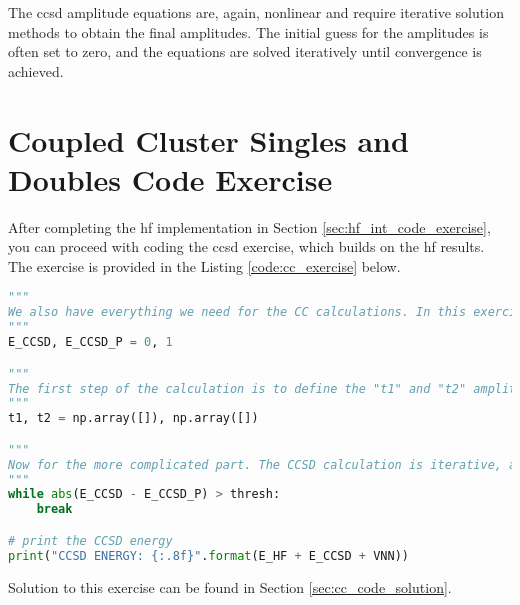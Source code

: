 The \acrshort{ccsd} amplitude equations are, again, nonlinear and require iterative solution methods to obtain the final amplitudes. The initial guess for the amplitudes is often set to zero, and the equations are solved iteratively until convergence is achieved.

\section{Coupled Cluster Singles and Doubles Code Exercise}

After completing the \acrshort{hf} implementation in Section \ref{sec:hf_int_code_exercise}, you can proceed with coding the \acrshort{ccsd} exercise, which builds on the \acrshort{hf} results. The exercise is provided in the Listing \ref{code:cc_exercise} below.

\raggedbottom\begin{lstlisting}[language=Python, caption={\acrshort{ccsd} exercise code. The energy and amplitudes are initialized with default values. The student is expected to fill the loop for the calculation of the excitation amplitudes and ground state energy. After the self-consistency is achieved the result is automatically printed.}, label=code:cc_exercise]
"""
We also have everything we need for the CC calculations. In this exercise, we will calculate the CCSD energy. Since the calculation will be iterative, I define here the CCSD energy as zero, the "E_CCSD_P" variable will be used to monitor convergence.
"""
E_CCSD, E_CCSD_P = 0, 1

"""
The first step of the calculation is to define the "t1" and "t2" amplitudes. These arrays can be initialized as zero arrays with the appropriate dimensions. I will leave this task to you.
"""
t1, t2 = np.array([]), np.array([])

"""
Now for the more complicated part. The CCSD calculation is iterative, and the convergence criterion is set by the "thresh" variable. The while loop should be filled with the appropriate calculations. The calculation of the "t1" and "t2" amplitudes is the most challenging part of the CCSD calculation. After convergence, the "E_CCSD" variable should store the final CCSD energy.
"""
while abs(E_CCSD - E_CCSD_P) > thresh:
    break

# print the CCSD energy
print("CCSD ENERGY: {:.8f}".format(E_HF + E_CCSD + VNN))
\end{lstlisting}

Solution to this exercise can be found in Section \ref{sec:cc_code_solution}.
